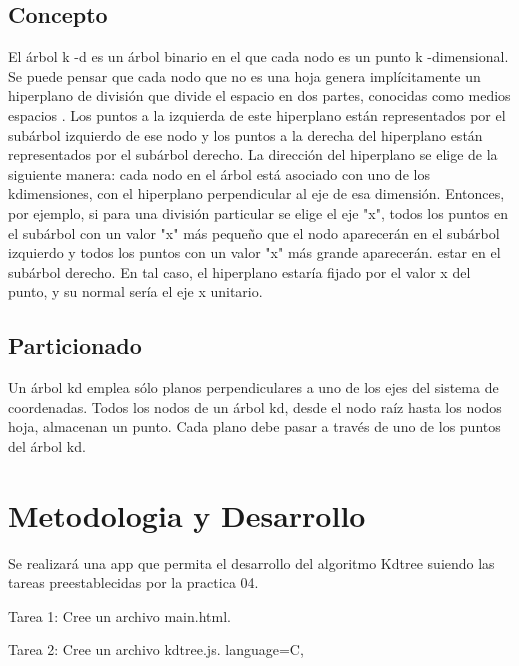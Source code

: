 \documentclass{article}
\begin{document}
\subsection{Concepto}
El árbol k -d es un árbol binario en el que cada nodo es un punto k -dimensional. Se puede pensar que cada nodo que no es una hoja genera implícitamente un hiperplano de división que divide el espacio en dos partes, conocidas como medios espacios . Los puntos a la izquierda de este hiperplano están representados por el subárbol izquierdo de ese nodo y los puntos a la derecha del hiperplano están representados por el subárbol derecho. La dirección del hiperplano se elige de la siguiente manera: cada nodo en el árbol está asociado con uno de los kdimensiones, con el hiperplano perpendicular al eje de esa dimensión. Entonces, por ejemplo, si para una división particular se elige el eje "x", todos los puntos en el subárbol con un valor "x" más pequeño que el nodo aparecerán en el subárbol izquierdo y todos los puntos con un valor "x" más grande aparecerán. estar en el subárbol derecho. En tal caso, el hiperplano estaría fijado por el valor x del punto, y su normal sería el eje x unitario.

\subsection{Particionado}
Un árbol kd emplea sólo planos perpendiculares a uno de los ejes del sistema de coordenadas. 
Todos los nodos de un árbol kd, desde el nodo raíz hasta los nodos hoja, almacenan un punto.
Cada plano debe pasar a través de uno de los puntos del árbol kd.

\section{Metodologia y Desarrollo}

Se realizará una app que permita el desarrollo del algoritmo Kdtree suiendo las tareas preestablecidas por la practica 04.

Tarea 1: Cree un archivo main.html.

Tarea 2: Cree un archivo kdtree.js.
{language=C,
}
\end{document}
